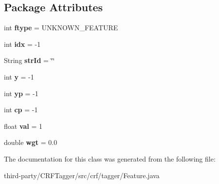 \subsection*{Package Attributes}
\begin{DoxyCompactItemize}
\item 
\hypertarget{classcrf_1_1tagger_1_1Feature_a98102373018fed0e1aad2cedcfa8a33d}{
int {\bfseries ftype} = UNKNOWN\_\-FEATURE}
\label{classcrf_1_1tagger_1_1Feature_a98102373018fed0e1aad2cedcfa8a33d}

\item 
\hypertarget{classcrf_1_1tagger_1_1Feature_a615412b8630860ad98d65dead7051d27}{
int {\bfseries idx} = -\/1}
\label{classcrf_1_1tagger_1_1Feature_a615412b8630860ad98d65dead7051d27}

\item 
\hypertarget{classcrf_1_1tagger_1_1Feature_a63f7d5d0a30549930c452d2a12eeb4f1}{
String {\bfseries strId} = \char`\"{}\char`\"{}}
\label{classcrf_1_1tagger_1_1Feature_a63f7d5d0a30549930c452d2a12eeb4f1}

\item 
\hypertarget{classcrf_1_1tagger_1_1Feature_aef748815f6d45baf4e25a16d18c9383e}{
int {\bfseries y} = -\/1}
\label{classcrf_1_1tagger_1_1Feature_aef748815f6d45baf4e25a16d18c9383e}

\item 
\hypertarget{classcrf_1_1tagger_1_1Feature_a8533d49367cbb1c002d414681e72e17b}{
int {\bfseries yp} = -\/1}
\label{classcrf_1_1tagger_1_1Feature_a8533d49367cbb1c002d414681e72e17b}

\item 
\hypertarget{classcrf_1_1tagger_1_1Feature_a7cc8feeafee98fbb4a5202af7e1def51}{
int {\bfseries cp} = -\/1}
\label{classcrf_1_1tagger_1_1Feature_a7cc8feeafee98fbb4a5202af7e1def51}

\item 
\hypertarget{classcrf_1_1tagger_1_1Feature_a72628ec698449e837d4533bd09c2c3c5}{
float {\bfseries val} = 1}
\label{classcrf_1_1tagger_1_1Feature_a72628ec698449e837d4533bd09c2c3c5}

\item 
\hypertarget{classcrf_1_1tagger_1_1Feature_aadd86b4aaead6fea153fae4ef1d635ff}{
double {\bfseries wgt} = 0.0}
\label{classcrf_1_1tagger_1_1Feature_aadd86b4aaead6fea153fae4ef1d635ff}

\end{DoxyCompactItemize}


The documentation for this class was generated from the following file:\begin{DoxyCompactItemize}
\item 
third-\/party/CRFTagger/src/crf/tagger/Feature.java\end{DoxyCompactItemize}

